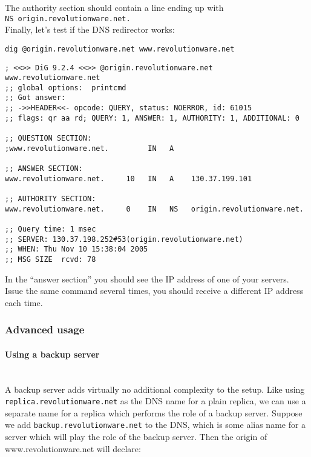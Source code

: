 \documentclass[10pt,a4paper]{article}
\makeatletter
\newenvironment{p}{\@open{P}{}}{\@close{P}}
\newenvironment{p}{}{\par}
\makeatother
\begin{document}
\begin{p}
The authority section should contain a line ending up with \\
\verb!NS origin.revolutionware.net.! \\
Finally, let's test if the DNS redirector works:
\end{p}

\begin{Verbatim}
dig @origin.revolutionware.net www.revolutionware.net
\end{Verbatim}

\begin{Verbatim}
; <<>> DiG 9.2.4 <<>> @origin.revolutionware.net www.revolutionware.net
;; global options:  printcmd
;; Got answer:
;; ->>HEADER<<- opcode: QUERY, status: NOERROR, id: 61015
;; flags: qr aa rd; QUERY: 1, ANSWER: 1, AUTHORITY: 1, ADDITIONAL: 0

;; QUESTION SECTION:
;www.revolutionware.net.         IN   A

;; ANSWER SECTION:
www.revolutionware.net.     10   IN   A    130.37.199.101

;; AUTHORITY SECTION:
www.revolutionware.net.     0    IN   NS   origin.revolutionware.net.

;; Query time: 1 msec
;; SERVER: 130.37.198.252#53(origin.revolutionware.net)
;; WHEN: Thu Nov 10 15:38:04 2005
;; MSG SIZE  rcvd: 78
\end{Verbatim}

\begin{p}
In the ``answer section'' you should see the IP address of one of your
servers.  Issue the same command several times, you should receive a different
IP address each time.
\end{p}

\subsubsection{Advanced usage}

\paragraph*{Using a backup server}~\\

\begin{p}
A backup server adds virtually no additional complexity to the setup.  Like
using \verb!replica.revolutionware.net! as the DNS name for a plain replica,
we can use a separate name for a replica which performs the role of a backup
server.  Suppose we add \verb!backup.revolutionware.net! to the DNS, which is
some alias name for a server which will play the role of the backup server.
Then the origin of www.revolutionware.net will declare:
\end{p}
\end{document}
